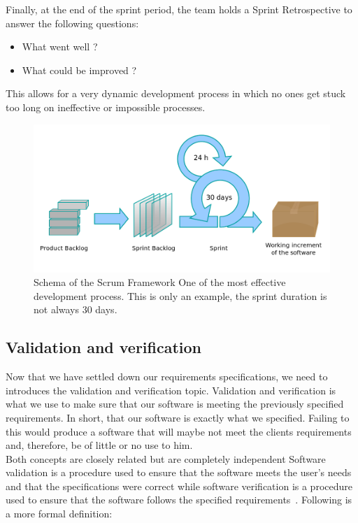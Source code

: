 \documentclass[12pt]{article}
\begin{document}
Finally, at the end of the sprint period, the team holds a Sprint Retrospective to answer the following questions:

\begin{itemize}

\item What went well ?
\item What could be improved ?

\end{itemize}

This allows for a very dynamic development process in which no ones get stuck too long on ineffective or impossible processes.

\begin{figure}
    \centering
    \includegraphics[scale=0.4]{scrum.png}
    \caption{Schema of the Scrum Framework One of the most effective development process. This is only an example, the sprint duration is not always 30 days.}
    \label{Scrum}
\end{figure}

\subsection{Validation and verification}

Now that we have settled down our requirements specifications, we need to introduces the validation and verification topic. Validation and verification is what we use to make sure that our software is meeting the previously specified requirements. In short, that our software is exactly what we specified. Failing to this would produce a software that will maybe not meet the clients requirements and, therefore, be of little or no use to him.\\

Both concepts are closely related but are completely independent Software validation is a procedure used to ensure that the software meets the user's needs and that the specifications were correct while software verification is a procedure used to ensure that the software follows the specified requirements~\cite{VnV:2016}. Following is a more formal definition:
\end{document}
